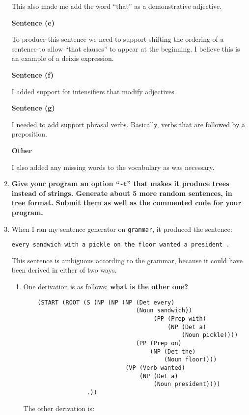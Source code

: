 \documentclass[10pt]{article}
\begin{document}
\begin{enumerate}
This also made me add the word ``that'' as a demonstrative adjective.

{\bf Sentence (e)}

To produce this sentence we need to support shifting the ordering of a sentence to allow ``that clauses'' to appear at the beginning. I believe this is an example of a deixis expression.

{\bf Sentence (f)}

I added support for intensifiers that modify adjectives.

{\bf Sentence (g)}

I needed to add support phrasal verbs. Basically, verbs that are followed by a preposition. 

{\bf Other}

I also added any missing words to the vocabulary as was necessary.


\item {\bf Give your program an option ``\verb|-t|'' that makes it produce
  trees instead of strings. Generate about 5 more random
sentences, in tree format. Submit them as well as the commented code
for your program.} 

\item When I ran my sentence generator on \verb|grammar|, it produced
  the sentence:
\begin{verbatim}
every sandwich with a pickle on the floor wanted a president .
\end{verbatim}
\noindent
This sentence is ambiguous according to the grammar, because it could
have been derived in either of two ways.
\begin{enumerate}
\item  One derivation is as follows; {\bf what is the other one?}

\bigskip
\begin{verbatim}
    (START (ROOT (S (NP (NP (NP (Det every)
                                (Noun sandwich))
                                     (PP (Prep with)
                                         (NP (Det a)
                                             (Noun pickle))))
                                (PP (Prep on)
                                    (NP (Det the)
                                        (Noun floor))))
                             (VP (Verb wanted)
                                 (NP (Det a)
                                     (Noun president))))
                  .))
\end{verbatim}

The other derivation is: 


\end{enumerate}
\end{enumerate}
\end{document}
